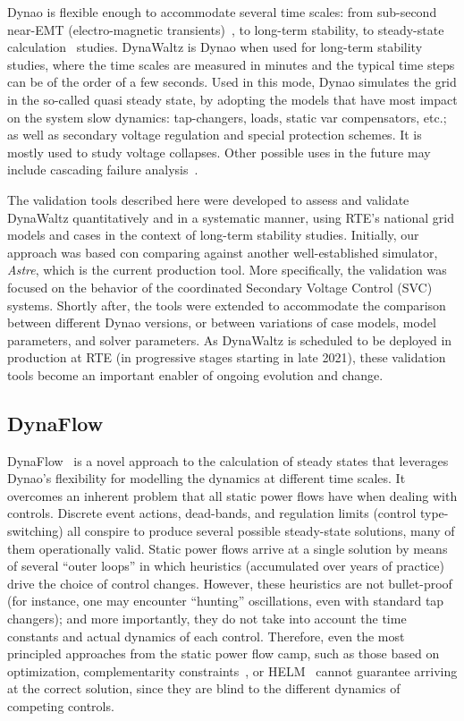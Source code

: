 \documentclass[conference]{IEEEtran}
\newcommand{\Dynawo}{Dyna\textomega o\xspace} %
\begin{document}
\Dynawo is flexible enough to accommodate several time scales: from sub-second
near-EMT (electro-magnetic transients)~\cite{Masoon21}, to long-term stability,
to steady-state calculation~\cite{Cossart21} studies. DynaWaltz is \Dynawo when
used for long-term stability studies, where the time scales are measured in
minutes and the typical time steps can be of the order of a few seconds. Used in
this mode, \Dynawo simulates the grid in the so-called quasi steady state, by
adopting the models that have most impact on the system slow dynamics:
tap-changers, loads, static var compensators, etc.; as well as secondary voltage
regulation and special protection schemes. It is mostly used to study voltage
collapses. Other possible uses in the future may include cascading failure
analysis~\cite{Bialek16}.

The validation tools described here were developed to assess and validate
DynaWaltz quantitatively and in a systematic manner, using RTE's national grid
models and cases in the context of long-term stability studies. Initially, our
approach was based con comparing against another well-established simulator,
\emph{Astre}, which is the current production tool. More specifically, the
validation was focused on the behavior of the coordinated Secondary Voltage
Control (SVC) systems. Shortly after, the tools were extended to accommodate the
comparison between different \Dynawo versions, or between variations of case
models, model parameters, and solver parameters. As DynaWaltz is scheduled to be
deployed in production at RTE (in progressive stages starting in late 2021),
these validation tools become an important enabler of ongoing evolution and
change.



\subsection{DynaFlow}

DynaFlow~\cite{Cossart21} is a novel approach to the calculation of steady
states that leverages \Dynawo's flexibility for modelling the dynamics at
different time scales. It overcomes an inherent problem that all static power
flows have when dealing with controls.  Discrete event actions, dead-bands, and
regulation limits (control type-switching) all conspire to produce several
possible steady-state solutions, many of them operationally valid.  Static power
flows arrive at a single solution by means of several ``outer loops'' in which
heuristics (accumulated over years of practice) drive the choice of control
changes. However, these heuristics are not bullet-proof (for instance, one may
encounter ``hunting'' oscillations, even with standard tap changers); and more
importantly, they do not take into account the time constants and actual
dynamics of each control. Therefore, even the most principled approaches from
the static power flow camp, such as those based on optimization\cite{Ju20},
complementarity constraints~\cite{Murray15}, or HELM~\cite{Trias18} cannot
guarantee arriving at the correct solution, since they are blind to the
different dynamics of competing controls.
\end{document}
